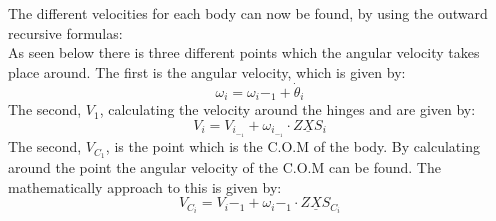 The different velocities for each body can now be found, by using the outward recursive formulas:\\
As seen below there is three different points which the angular velocity takes place around. The first is the angular velocity, which is given by:\\
\begin{equation}\label{eq:W}
\omega_i=\omega_i-_1+\dot\theta_i
\end{equation}
The second, \(V_1\), calculating the velocity around the hinges and are given by:\\
\begin{equation}\label{eq:Vi}
V_i=V_i_-_1+\omega_i_-_1\cdot Z\underline{X}S_i
\end{equation}
The  second, \(V_C_1\), is the point which is the C.O.M of the body. By calculating around the point the angular velocity of the C.O.M can be found. The mathematically approach to this is given by:\\
\begin{equation}\label{eq:Vci}
V_C_i=V_i-_1+\omega_i-_1\cdot Z\underline{X}S_C_i
\end{equation}

